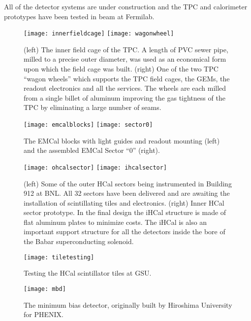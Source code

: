 All of the detector systems are under construction and the TPC and calorimeter prototypes have been tested in beam at Fermilab.

\begin{figure}[hbt!]
  \centering
  \texttt{[image: innerfieldcage]}
  \hfill
  \texttt{[image: wagonwheel]}
  \caption{(left) The inner field cage of the TPC. A length of PVC
    sewer pipe, milled to a precise outer diameter, was used as an
    economical form upon which the field cage was built.  (right) One
    of the two TPC ``wagon wheels'' which supports the TPC field
    cages, the GEMs, the readout electronics and all the services.
    The wheels are each milled from a single billet of aluminum
    improving the gas tightness of the TPC by eliminating a large
    number of seams.}
  \label{fig:wagonwheel}
\end{figure}

\begin{figure}[hbt!]
  \centering
  \texttt{[image: emcalblocks]}
  \hfill
  \texttt{[image: sector0]}
  \caption{The EMCal blocks with light guides and readout mounting (left) and the assembled EMCal Sector ``0'' (right).}
  \label{fig:emcal}
\end{figure}

\begin{figure}[hbt!]
  \centering
  \texttt{[image: ohcalsector]}
  \hfill
  \texttt{[image: ihcalsector]}
  \caption{(left) Some of the outer HCal sectors being instrumented in
    Building 912 at BNL.  All 32 sectors have been delivered and are
    awaiting the installation of scintillating tiles and electronics. (right) Inner HCal sector prototype. In the final design the
    iHCal structure is made of flat aluminum plates to minimize
    costs. The iHCal is also an important support structure for all
    the detectors inside the bore of the Babar superconducting
    solenoid.}
  \label{fig:hcal}
\end{figure}

\begin{figure}[hbt!]
  \centering
  \texttt{[image: tiletesting]}
  \caption{Testing the HCal scintillator tiles at GSU.}
  \label{fig:tiletesting}
\end{figure}

\begin{figure}[hbt!]
  \centering
  \texttt{[image: mbd]}
  \caption{The minimum bias detector, originally built by Hiroshima
    University for PHENIX.}
  \label{fig:mbd}
\end{figure}

